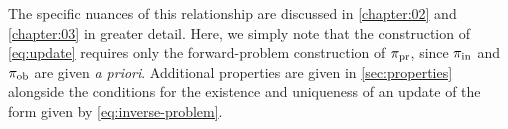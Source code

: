 The specific nuances of this relationship are discussed in \ref{chapter:02} and \ref{chapter:03} in greater detail.
Here, we simply note that the construction of \eqref{eq:update} requires only the forward-problem construction of $\operatorname*{\pi_{pr}}$, since $\operatorname*{\pi_{in}}$ and $\operatorname*{\pi_{ob}}$ are given \emph{a priori}.
Additional properties are given in \ref{sec:properties} alongside the conditions for the existence and uniqueness of an update of the form given by \eqref{eq:inverse-problem}. 


